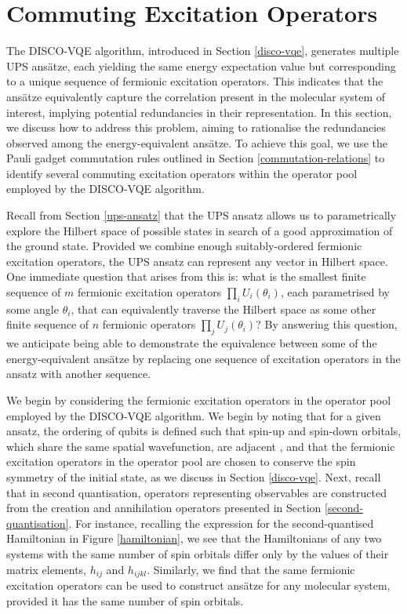 \section{Commuting Excitation Operators}%
\label{operator-commutations}

The DISCO-VQE algorithm, introduced in Section \ref{disco-vqe}, generates multiple UPS ansätze, each yielding the same energy expectation value but corresponding to a unique sequence of fermionic excitation operators. This indicates that the ansätze equivalently capture the correlation present in the molecular system of interest, implying potential redundancies in their representation. In this section, we discuss how to address this problem, aiming to rationalise the redundancies observed among the energy-equivalent ansätze. To achieve this goal, we use the Pauli gadget commutation rules outlined in Section \ref{commutation-relations} to identify several commuting excitation operators within the operator pool employed by the DISCO-VQE algorithm.

Recall from Section \ref{ups-ansatz} that the UPS ansatz allows us to parametrically explore the Hilbert space of possible states in search of a good approximation of the ground state. Provided we combine enough suitably-ordered fermionic excitation operators, the UPS ansatz can represent any vector in Hilbert space. One immediate question that arises from this is: what is the smallest finite sequence of $m$ fermionic excitation operators $\prod_i U_i(\theta_i)$, each parametrised by some angle $\theta_i$, that can equivalently traverse the Hilbert space as some other finite sequence of $n$ fermionic operators $\prod_j U_j(\theta_i)$? By answering this question, we anticipate being able to demonstrate the equivalence between some of the energy-equivalent ansätze by replacing one sequence of excitation operators in the ansatz with another sequence.

We begin by considering the fermionic excitation operators in the operator pool employed by the DISCO-VQE algorithm. We begin by noting that for a given ansatz, the ordering of qubits is defined such that spin-up and spin-down orbitals, which share the same spatial wavefunction, are adjacent \cite{Burton2023}, and that the fermionic excitation operators in the operator pool are chosen to conserve the spin symmetry of the initial state, as we discuss in Section \ref{disco-vqe}. Next, recall that in second quantisation, operators representing observables are constructed from the creation and annihilation operators presented in Section \ref{second-quantisation}. For instance, recalling the expression for the second-quantised Hamiltonian in Figure \ref{hamiltonian}, we see that the Hamiltonians of any two systems with the same number of spin orbitals differ only by the values of their matrix elements, $h_{ij}$ and $h_{ijkl}$. Similarly, we find that the same fermionic excitation operators can be used to construct ansätze for any molecular system, provided it has the same number of spin orbitals.

